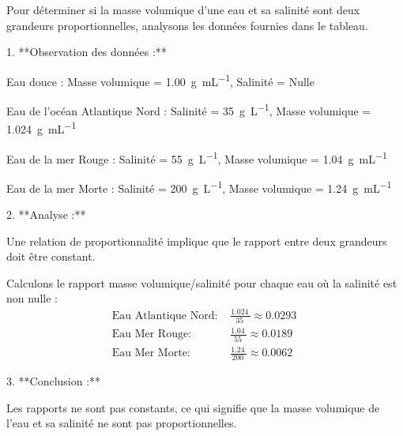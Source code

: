 \documentclass[answers]{exam}
\begin{document}
\begin{solution}
Pour déterminer si la masse volumique d'une eau et sa salinité sont deux grandeurs proportionnelles, analysons les données fournies dans le tableau.

1. **Observation des données :**
   \begin{compactitem}
      \item Eau douce : Masse volumique = \SI{1.00}{\gram\per\milli\liter}, Salinité = Nulle
      \item Eau de l'océan Atlantique Nord : Salinité = \SI{35}{\gram\per\liter}, Masse volumique = \SI{1.024}{\gram\per\milli\liter}
      \item Eau de la mer Rouge : Salinité = \SI{55}{\gram\per\liter}, Masse volumique = \SI{1.04}{\gram\per\milli\liter}
      \item Eau de la mer Morte : Salinité = \SI{200}{\gram\per\liter}, Masse volumique = \SI{1.24}{\gram\per\milli\liter}
   \end{compactitem}

2. **Analyse :**
   \begin{compactitem}
      \item Une relation de proportionnalité implique que le rapport entre deux grandeurs doit être constant.
      \item Calculons le rapport masse volumique/salinité pour chaque eau où la salinité est non nulle :
        \begin{align*}
        \text{Eau Atlantique Nord: } & \frac{\SI{1.024}{}}{\SI{35}{}} \approx \SI{0.0293}{} \\
        \text{Eau Mer Rouge: } & \frac{\SI{1.04}{}}{\SI{55}{}} \approx \SI{0.0189}{} \\
        \text{Eau Mer Morte: } & \frac{\SI{1.24}{}}{\SI{200}{}} \approx \SI{0.0062}{}
        \end{align*}
   \end{compactitem}

3. **Conclusion :**
   \begin{compactitem}
      \item Les rapports ne sont pas constants, ce qui signifie que la masse volumique de l'eau et sa salinité ne sont pas proportionnelles.
   \end{compactitem}
\end{solution}
\end{document}
